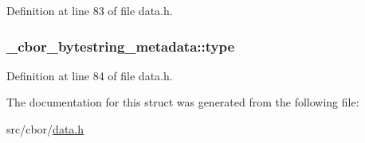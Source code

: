 Definition at line 83 of file data.\-h.

\hypertarget{struct__cbor__bytestring__metadata_ab43be7eca10ef7f0501d9f87482e27c3}{
\subsubsection[{type}]{ \-\_\-cbor\-\_\-bytestring\-\_\-metadata\-::type}}\label{struct__cbor__bytestring__metadata_ab43be7eca10ef7f0501d9f87482e27c3}


Definition at line 84 of file data.\-h.



The documentation for this struct was generated from the following file\-:\begin{DoxyCompactItemize}
\item 
src/cbor/\hyperlink{data_8h}{data.\-h}\end{DoxyCompactItemize}
